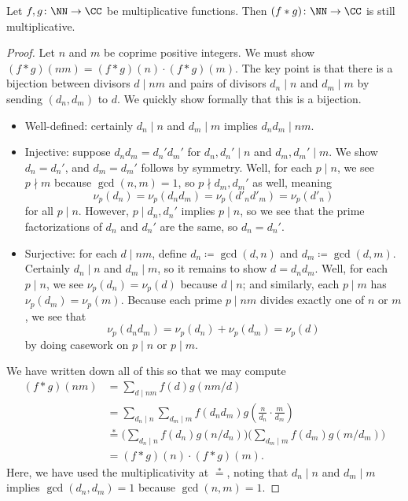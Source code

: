 \documentclass[../notes.tex]{subfiles}
\begin{document}
\begin{lemma} \label{lem:dir-conv-mult}
	Let $f,g\colon\NN\to\CC$ be multiplicative functions. Then $(f*g)\colon\NN\to\CC$ is still multiplicative.
\end{lemma}
\begin{proof}
	Let $n$ and $m$ be coprime positive integers. We must show $(f*g)(nm)=(f*g)(n)\cdot(f*g)(m)$. The key point is that there is a bijection between divisors $d\mid nm$ and pairs of divisors $d_n\mid n$ and $d_m\mid m$ by sending $(d_n,d_m)$ to $d$. We quickly show formally that this is a bijection.
	\begin{itemize}
		\item Well-defined: certainly $d_n\mid n$ and $d_m\mid m$ implies $d_nd_m\mid nm$.
		\item Injective: suppose $d_nd_m=d_n'd_m'$ for $d_n,d_n'\mid n$ and $d_m,d_m'\mid m$. We show $d_n=d_n'$, and $d_m=d_m'$ follows by symmetry. Well, for each $p\mid n$, we see $p\nmid m$ because $\gcd(n,m)=1$, so $p\nmid d_m,d_m'$ as well, meaning
		\[\nu_p(d_n)=\nu_p(d_nd_m)=\nu_p(d'_nd'_m)=\nu_p(d'_n)\]
		for all $p\mid n$. However, $p\mid d_n,d_n'$ implies $p\mid n$, so we see that the prime factorizations of $d_n$ and $d_n'$ are the same, so $d_n=d_n'$.
		\item Surjective: for each $d\mid nm$, define $d_n\coloneqq\gcd(d,n)$ and $d_m\coloneqq\gcd(d,m)$. Certainly $d_n\mid n$ and $d_m\mid m$, so it remains to show $d=d_nd_m$. Well, for each $p\mid n$, we see $\nu_p(d_n)=\nu_p(d)$ because $d\mid n$; and similarly, each $p\mid m$ has $\nu_p(d_m)=\nu_p(m)$. Because each prime $p\mid nm$ divides exactly one of $n$ or $m$, we see that
		\[\nu_p(d_nd_m)=\nu_p(d_n)+\nu_p(d_m)=\nu_p(d)\]
		by doing casework on $p\mid n$ or $p\mid m$.
	\end{itemize}
	We have written down all of this so that we may compute
	\begin{align*}
		(f*g)(nm) &= \sum_{d\mid nm}f(d)g(nm/d) \\
		&= \sum_{d_n\mid n}\sum_{d_m\mid m}f(d_nd_m)g\left(\frac n{d_n}\cdot\frac m{d_m}\right) \\
		&\stackrel*= \Bigg(\sum_{d_n\mid n}f(d_n)g(n/d_n)\Bigg)\Bigg(\sum_{d_m\mid m}f(d_m)g(m/d_m)\Bigg) \\
		&= (f*g)(n)\cdot(f*g)(m).
	\end{align*}
	Here, we have used the multiplicativity at $\stackrel*=$, noting that $d_n\mid n$ and $d_m\mid m$ implies $\gcd(d_n,d_m)=1$ because $\gcd(n,m)=1$.
\end{proof}
\end{document}
